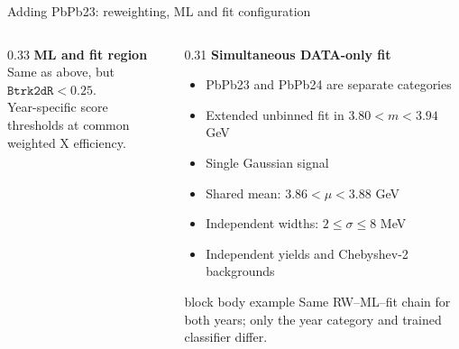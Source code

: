 \documentclass[11pt,aspectratio=169]{beamer}
\begin{document}
\begin{frame}[label=p9]{Adding PbPb23: reweighting, ML and fit configuration}
\begin{columns}[T,onlytextwidth]
\begin{column}{0.33\textwidth}
      \vspace{0.20em}
      \textbf{ML and fit region}\\[-0.10em]
      Same as above, but $\texttt{Btrk2dR}<0.25$.\\
      Year-specific score thresholds at common weighted X efficiency.
    \end{column}

    \begin{column}{0.31\textwidth}
      \textbf{Simultaneous DATA-only fit}
      \begin{itemize}
        \setlength{\itemsep}{0.08em}
        \item PbPb23 and PbPb24 are separate categories
        \item Extended unbinned fit in $3.80<m<3.94$ GeV
        \item Single Gaussian signal
        \item Shared mean: $3.86<\mu<3.88$ GeV
        \item Independent widths: $2\leq\sigma\leq8$ MeV
        \item Independent yields and Chebyshev-2 backgrounds
      \end{itemize}

      \vspace{0.20em}
      \begin{beamercolorbox}[wd=\linewidth,sep=0.40em,center,rounded=true]{block body example}
        Same RW--ML--fit chain for both years; only the year category and trained classifier differ.
      \end{beamercolorbox}
    \end{column}
  \end{columns}
\end{frame}
\end{document}
